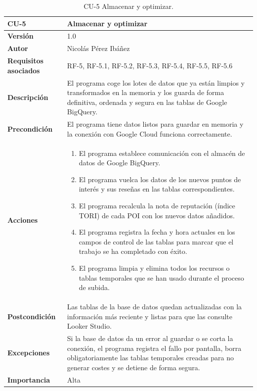 \begin{table}[p]
	\centering
	\begin{tabularx}{\linewidth}{ p{} p{} }
		\toprule
		\textbf{CU-5}    & \textbf{Almacenar y optimizar}\\
		\toprule
		\textbf{Versión}              & 1.0    \\
		\textbf{Autor}                & Nicolás Pérez Ibáñez \\
		\textbf{Requisitos asociados} & RF-5, RF-5.1, RF-5.2, RF-5.3, RF-5.4, RF-5.5, RF-5.6 \\
		\textbf{Descripción}          & El programa coge los lotes de datos que ya están limpios y transformados en la memoria y los guarda de forma definitiva, ordenada y segura en las tablas de Google BigQuery. \\
		\textbf{Precondición}         & El programa tiene datos listos para guardar en memoria y la conexión con Google Cloud funciona correctamente. \\
		\textbf{Acciones}             &
		\begin{enumerate}
			\def\labelenumi{\arabic{enumi}.}
			\tightlist
			\item El programa establece comunicación con el almacén de datos de Google BigQuery.
			\item El programa vuelca los datos de los nuevos puntos de interés y sus reseñas en las tablas correspondientes.
			\item El programa recalcula la nota de reputación (índice TORI) de cada POI con los nuevos datos añadidos.
			\item El programa registra la fecha y hora actuales en los campos de control de las tablas para marcar que el trabajo se ha completado con éxito.
			\item El programa limpia y elimina todos los recursos o tablas temporales que se han usado durante el proceso de subida.
		\end{enumerate}\\
		\textbf{Postcondición}        & Las tablas de la base de datos quedan actualizadas con la información más reciente y listas para que las consulte Looker Studio. \\
		\textbf{Excepciones}          & Si la base de datos da un error al guardar o se corta la conexión, el programa registra el fallo por pantalla, borra obligatoriamente las tablas temporales creadas para no generar costes y se detiene de forma segura. \\
		\textbf{Importancia}          & Alta \\
		\bottomrule
	\end{tabularx}
	\caption{CU-5 Almacenar y optimizar.}
\end{table}

